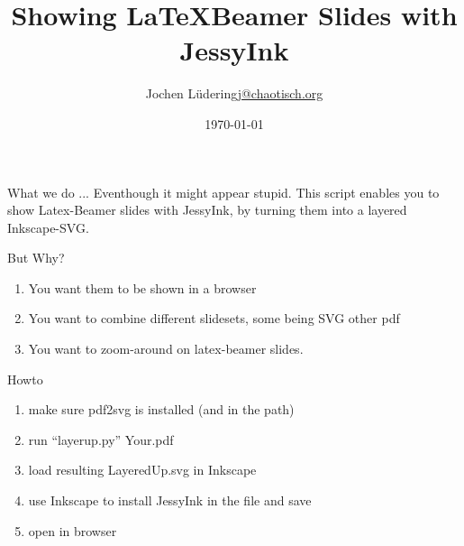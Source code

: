 \documentclass{beamer}
\title{Showing \LaTeX Beamer Slides with JessyInk}
\author{\texorpdfstring{Jochen Lüdering\newline\url{j@chaotisch.org}}{Jochen Lüdering}}
\date{\today}
\begin{document}
\begin{frame}
\maketitle
\end{frame}
\begin{frame}{What we do ...}
Eventhough it might appear stupid. This script enables you to show Latex-Beamer slides with JessyInk, by turning them into a layered Inkscape-SVG.
\end{frame}
\begin{frame}{But Why?}
\begin{enumerate}
\item You want them to be shown in a browser
\item You want to combine different slidesets, some being SVG other pdf
\item You want to zoom-around on latex-beamer slides.
\end{enumerate}
\end{frame}
\begin{frame}{Howto}
\begin{enumerate}
\item make sure pdf2svg is installed (and in the path)
\item run ``layerup.py'' Your.pdf
\item load resulting LayeredUp.svg in Inkscape
\item use Inkscape to install JessyInk in the file and save
\item open in browser
\end{enumerate}
\end{frame}
\end{document}
